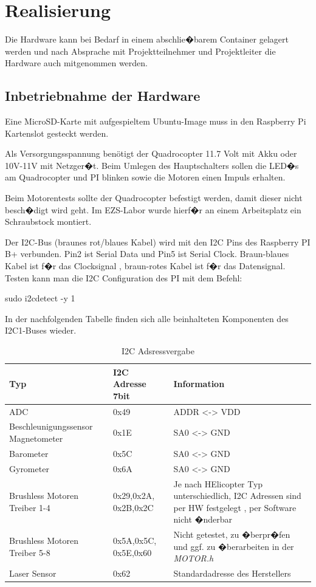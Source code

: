 ﻿\chapter{Realisierung}
\label{sec:real}

Die Hardware kann bei Bedarf in einem abschlie�barem Container gelagert werden und nach Absprache mit Projektteilnehmer und Projektleiter die Hardware auch mitgenommen werden. 

\section{Inbetriebnahme der Hardware}
\label{Inbetriebname}
Eine MicroSD-Karte mit aufgespieltem Ubuntu-Image muss in den Raspberry Pi Kartenslot gesteckt werden.

Als Versorgungsspannung benötigt der Quadrocopter 11.7 Volt mit Akku oder 10V-11V mit Netzger�t. Beim Umlegen des Hauptschalters sollen die LED�s am Quadrocopter und PI blinken sowie die Motoren einen Impuls erhalten.

Beim Motorentests sollte der Quadrocopter befestigt werden, damit dieser nicht besch�digt wird geht. Im EZS-Labor wurde hierf�r an einem Arbeitsplatz ein Schraubstock montiert.

Der I2C-Bus (braunes rot/blaues Kabel) wird mit den I2C Pins des Raspberry PI B+ verbunden. Pin2 ist Serial Data und Pin5 ist Serial Clock. Braun-blaues Kabel ist f�r das Clocksignal , braun-rotes Kabel ist f�r das Datensignal. Testen kann man die I2C Configuration des PI mit dem Befehl:

sudo i2cdetect -y 1

In der nachfolgenden Tabelle finden sich alle beinhalteten Komponenten des I2C1-Buses wieder.
\begin{table}[H]
	\begin{center}
		\begin{tabular}{| l | p{3cm} | |p{5cm}|}
			\hline
			Typ & I2C Adresse 7bit  & Information \\
			\hline
			ADC & 0x49 & ADDR <-> VDD\\
			\hline
			Beschleunigungssensor  \newline  Magnetometer & 0x1E  & SA0 <-> GND  \\
			\hline 
			Barometer & 0x5C & SA0 <-> GND \\
			\hline 
			Gyrometer & 0x6A & SA0 <-> GND\\
			\hline
			Brushless Motoren Treiber 1-4  &0x29,0x2A, 0x2B,0x2C& Je nach HElicopter Typ unterschiedlich, I2C Adressen sind per HW festgelegt , per Software nicht �nderbar\\
			\hline 
			Brushless Motoren Treiber 5-8  & 0x5A,0x5C, 0x5E,0x60& Nicht getestet, zu �berpr�fen und ggf. zu �berarbeiten in der \textit{MOTOR.h}\\
			\hline
			Laser Sensor & 0x62 & Standardadresse des Herstellers\\
			\hline
		\end{tabular}
	\end{center}
	\caption{I2C Adsressvergabe}
\end{table}




